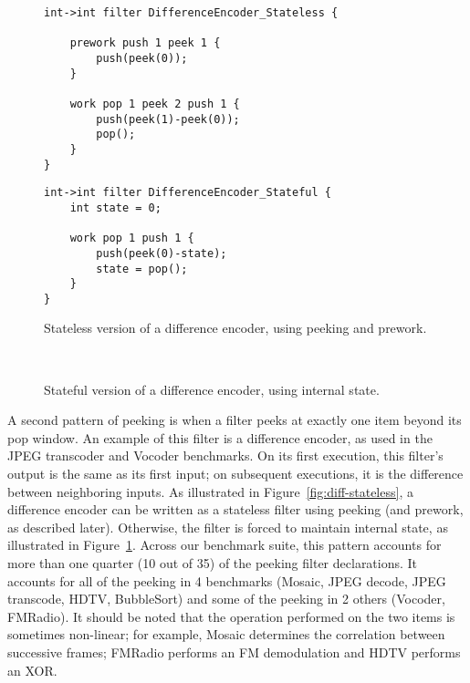 \begin{figure}[t]

\begin{minipage}{0.5\textwidth}
\centering
\ninepoint
\begin{verbatim}
int->int filter DifferenceEncoder_Stateless {

    prework push 1 peek 1 {
        push(peek(0));
    }

    work pop 1 peek 2 push 1 {
        push(peek(1)-peek(0));
        pop();
    }
}
\end{verbatim}
\end{minipage}
\begin{minipage}{0.5\textwidth}
\centering
\ninepoint
\begin{verbatim}
int->int filter DifferenceEncoder_Stateful {
    int state = 0;

    work pop 1 push 1 {
        push(peek(0)-state);
        state = pop();
    }
}
\end{verbatim}
\end{minipage}

\begin{minipage}{0.45\textwidth}
\centering
\caption{Stateless version of a difference encoder, using peeking
and prework.\protect\label{fig:diff-stateless}}
\end{minipage}
\begin{minipage}{0.05\textwidth}
~
\end{minipage}
\begin{minipage}{0.45\textwidth}
\centering
\caption{Stateful version of a difference encoder, using 
internal state.\protect\label{fig:diff-stateful}}
\end{minipage}
\end{figure}

A second pattern of peeking is when a filter peeks at exactly one item
beyond its pop window.  An example of this filter is a difference
encoder, as used in the JPEG transcoder and Vocoder benchmarks.  On
its first execution, this filter's output is the same as its first
input; on subsequent executions, it is the difference between
neighboring inputs.  As illustrated in
Figure~\ref{fig:diff-stateless}, a difference encoder can be written
as a stateless filter using peeking (and prework, as described later).
Otherwise, the filter is forced to maintain internal state, as
illustrated in Figure~\ref{fig:diff-stateful}.  Across our benchmark
suite, this pattern accounts for more than one quarter (10 out of 35)
of the peeking filter declarations.  It accounts for all of the
peeking in 4 benchmarks (Mosaic, JPEG decode, JPEG transcode, HDTV,
BubbleSort) and some of the peeking in 2 others (Vocoder, FMRadio).
It should be noted that the operation performed on the two items is
sometimes non-linear; for example, Mosaic determines the correlation
between successive frames; FMRadio performs an FM demodulation and
HDTV performs an XOR.

